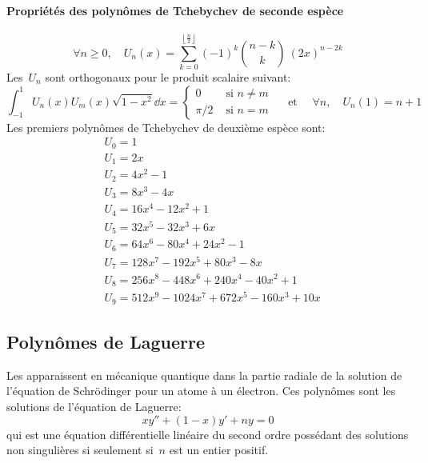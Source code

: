 \paragraph{Propriétés des polynômes de Tchebychev de seconde espèce} 
\begin{equation}
\forall n\ge 0, \quad U_n(x)=\sum_{k=0}^{\left\lfloor \frac n2\right \rfloor}(-1)^k \binom{n-k}k~(2x)^{n-2k} 
\end{equation}
Les~$U_n$ sont orthogonaux pour le produit scalaire suivant: 
\begin{equation}
\int_{-1}^1 U_n(x)U_m(x)\sqrt{1-x^2}\dd x = 
\begin{cases} 0&\text{ si } n\ne m\\ \pi/2 &\text{ si } n=m 
\end{cases} 
\quad\text{ et }\quad\forall n,\quad U_n(1)=n+1 
\end{equation}
Les premiers polynômes de Tchebychev de deuxième espèce sont:
\begin{equation}
\begin{aligned}
&U_0 = 1 \\
&U_1 = 2x \\
&U_2 = 4x^2 - 1 \\
&U_3 = 8x^3 - 4x \\
&U_4 = 16x^4 - 12x^2 + 1 \\
&U_5 = 32x^5 - 32x^3 + 6x \\
&U_6 = 64x^6 - 80x^4 + 24x^2 - 1 \\
&U_7 = 128x^7 - 192x^5 + 80x^3 - 8x \\
&U_8 = 256x^8 - 448 x^6 + 240 x^4 - 40 x^2 + 1 \\
&U_9 = 512x^9 - 1024 x^7 + 672 x^5 - 160 x^3 + 10 x
\end{aligned}
\end{equation}
\subsection{Polynômes de Laguerre} 
Les  apparaissent en mécanique quantique dans la partie radiale de la solution de l'équation de Schrödinger pour un atome à un électron. Ces polynômes sont les solutions de l'équation de Laguerre: 
\begin{equation}
 xy'' + (1 - x)y' + ny = 0 
\end{equation}
qui est une équation différentielle linéaire du second ordre possédant des solutions non singulières si seulement si~$n$ est un entier positif. 

